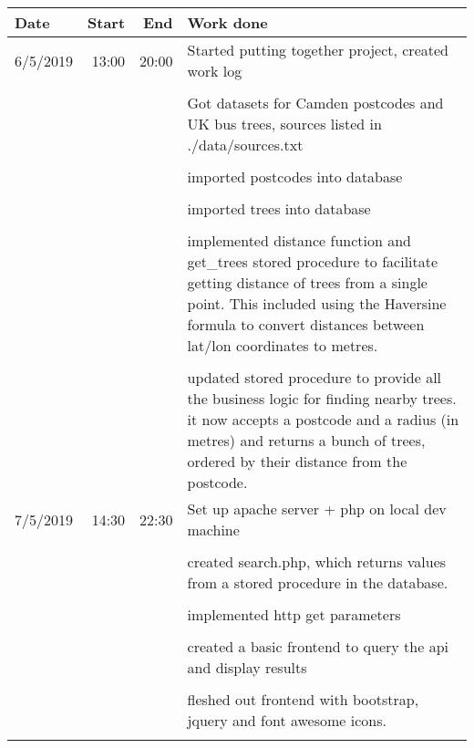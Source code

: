 \documentclass{article}
\begin{document}
\begin{table}[h!]
    \begin{tabular}{l|r|r|p{15cm}}  %
        \textbf{Date} & \textbf{Start} & \textbf{End} & \textbf{Work done} \\
        \hline
        6/5/2019    &   13:00   &   20:00   &   Started putting together project, created work log\\
        &   &   &   \\
        &   &                               &   Got datasets for Camden postcodes and UK bus trees, sources listed in ./data/sources.txt \\
        &   &   &   \\
        &   &                               &   imported postcodes into database \\
        &   &   &   \\
        &   &                               &   imported trees into database \\
        &   &   &   \\
        &   &                               &   implemented distance function and get\_trees stored procedure to facilitate getting distance of trees from a single point. This included using the Haversine formula to convert distances between lat/lon coordinates to metres.  \\
        &   &   &   \\
        &   &                               &   updated stored procedure to provide all the business logic for finding nearby trees. it now accepts a postcode and a radius (in metres) and returns a bunch of trees, ordered by their distance from the postcode. \\
        \hline
        7/5/2019    &   14:30   &   22:30   &   Set up apache server + php on local dev machine\\
        &   &   &   \\
        &   &                               &   created search.php, which returns values from a stored procedure in the database.\\
        &   &   &   \\
        &   &                               &   implemented http get parameters\\
        &   &   &   \\
        &   &                               &   created a basic frontend to query the api and display results\\
        &   &   &   \\
        &   &                               &   fleshed out frontend with bootstrap, jquery and font awesome icons.\\
        \hline
        &   &   &   \\
    \end{tabular}
\end{table}
\end{document}
